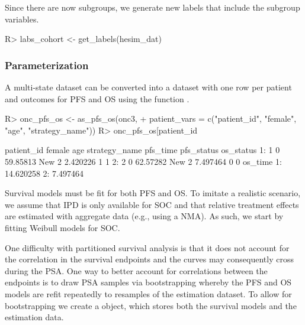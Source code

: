 \documentclass[article, nojss]{jss}\usepackage[]{graphicx}\usepackage[]{color}
\begin{document}
\begin{Schunk}
\end{Schunk}

Since there are now subgroups, we generate new labels that include the subgroup variables.

\begin{Schunk}
\begin{Sinput}
R> labs_cohort <- get_labels(hesim_dat)
\end{Sinput}
\end{Schunk}

\subsubsection{Parameterization}
A multi-state dataset can be converted into a dataset with one row per patient and outcomes for PFS and OS using the function . 

\begin{Schunk}
\begin{Sinput}
R> onc_pfs_os <- as_pfs_os(onc3, 
+    patient_vars = c("patient_id", "female", "age", "strategy_name"))
R> onc_pfs_os[patient_id %
\end{Sinput}
\begin{Soutput}
   patient_id female      age strategy_name pfs_time pfs_status os_status
1:          1      0 59.85813         New 2 2.420226          1         1
2:          2      0 62.57282         New 2 7.497464          0         0
     os_time
1: 14.620258
2:  7.497464
\end{Soutput}
\end{Schunk}

Survival models must be fit for both PFS and OS. To imitate a realistic scenario, we assume that IPD is only available for SOC and that relative treatment effects are estimated with aggregate data (e.g., using a NMA). As such, we start by fitting Weibull models for SOC. 

One difficulty with partitioned survival analysis is that it does not account for the correlation in the survival endpoints and the curves may consequently cross during the PSA. One way to better account for correlations between the endpoints is to draw PSA samples via bootstrapping whereby the PFS and OS models are refit repeatedly to resamples of the estimation dataset. To allow for bootstrapping we create a  object, which stores both the survival models and the estimation data.
\end{document}
